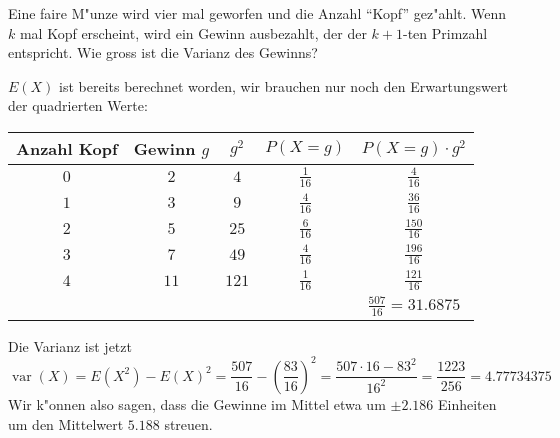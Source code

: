 Eine faire M"unze wird vier mal geworfen und die Anzahl ``Kopf'' gez"ahlt.
Wenn $k$ mal Kopf erscheint, wird ein Gewinn ausbezahlt, der der $k+1$-ten
Primzahl entspricht. Wie gross ist die Varianz des Gewinns?

\begin{loesung}
$E(X)$ ist bereits berechnet worden, wir brauchen nur noch den
Erwartungswert der quadrierten Werte:
\begin{center}
\begin{tabular}{|c|c|c|c|c|}
\hline
Anzahl Kopf&Gewinn $g$&$g^2$&$P(X=g)$&$P(X=g)\cdot g^2$\\
\hline
$0$&$ 2$&$  4$&$\frac1{16}$&$\frac{  4}{16}$\\
$1$&$ 3$&$  9$&$\frac4{16}$&$\frac{ 36}{16}$\\
$2$&$ 5$&$ 25$&$\frac6{16}$&$\frac{150}{16}$\\
$3$&$ 7$&$ 49$&$\frac4{16}$&$\frac{196}{16}$\\
$4$&$11$&$121$&$\frac1{16}$&$\frac{121}{16}$\\
\hline
&&&&$\frac{507}{16}=31.6875$\\
\hline
\end{tabular}
\end{center}
Die Varianz ist jetzt
\[
\operatorname{var}(X)
=E(X^2)-E(X)^2
=\frac{507}{16}-\left(\frac{83}{16}\right)^2
=\frac{507\cdot 16 - 83^2}{16^2}=\frac{1223}{256}=4.77734375
\]
Wir k"onnen also sagen, dass die Gewinne im Mittel
etwa um $\pm2.186$ Einheiten um den Mittelwert $5.188$
streuen.
\end{loesung}

